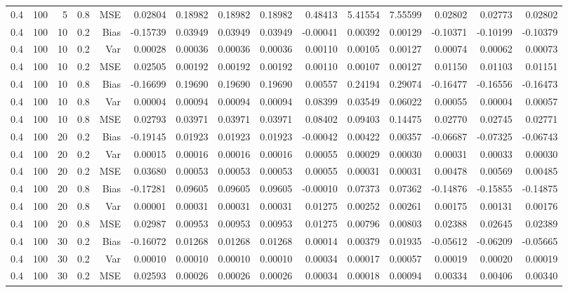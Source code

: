 \begin{table}[!htbp]
\begin{tabular}{lrrrrrrrrrrrrrr}
0.4 & 100 &  5 & 0.8 & MSE & 0.02804 & 0.18982 & 0.18982 & 0.18982 & 0.48413 & 5.41554 & 7.55599 & 0.02802 & 0.02773 & 0.02802 \\
0.4 & 100 & 10 & 0.2 & Bias & -0.15739 & 0.03949 & 0.03949 & 0.03949 & -0.00041 & 0.00392 & 0.00129 & -0.10371 & -0.10199 & -0.10379 \\
0.4 & 100 & 10 & 0.2 & Var & 0.00028 & 0.00036 & 0.00036 & 0.00036 & 0.00110 & 0.00105 & 0.00127 & 0.00074 & 0.00062 & 0.00073 \\
0.4 & 100 & 10 & 0.2 & MSE & 0.02505 & 0.00192 & 0.00192 & 0.00192 & 0.00110 & 0.00107 & 0.00127 & 0.01150 & 0.01103 & 0.01151 \\
0.4 & 100 & 10 & 0.8 & Bias & -0.16699 & 0.19690 & 0.19690 & 0.19690 & 0.00557 & 0.24194 & 0.29074 & -0.16477 & -0.16556 & -0.16473 \\
0.4 & 100 & 10 & 0.8 & Var & 0.00004 & 0.00094 & 0.00094 & 0.00094 & 0.08399 & 0.03549 & 0.06022 & 0.00055 & 0.00004 & 0.00057 \\
0.4 & 100 & 10 & 0.8 & MSE & 0.02793 & 0.03971 & 0.03971 & 0.03971 & 0.08402 & 0.09403 & 0.14475 & 0.02770 & 0.02745 & 0.02771 \\
0.4 & 100 & 20 & 0.2 & Bias & -0.19145 & 0.01923 & 0.01923 & 0.01923 & -0.00042 & 0.00422 & 0.00357 & -0.06687 & -0.07325 & -0.06743 \\
0.4 & 100 & 20 & 0.2 & Var & 0.00015 & 0.00016 & 0.00016 & 0.00016 & 0.00055 & 0.00029 & 0.00030 & 0.00031 & 0.00033 & 0.00030 \\
0.4 & 100 & 20 & 0.2 & MSE & 0.03680 & 0.00053 & 0.00053 & 0.00053 & 0.00055 & 0.00031 & 0.00031 & 0.00478 & 0.00569 & 0.00485 \\
0.4 & 100 & 20 & 0.8 & Bias & -0.17281 & 0.09605 & 0.09605 & 0.09605 & -0.00010 & 0.07373 & 0.07362 & -0.14876 & -0.15855 & -0.14875 \\
0.4 & 100 & 20 & 0.8 & Var & 0.00001 & 0.00031 & 0.00031 & 0.00031 & 0.01275 & 0.00252 & 0.00261 & 0.00175 & 0.00131 & 0.00176 \\
0.4 & 100 & 20 & 0.8 & MSE & 0.02987 & 0.00953 & 0.00953 & 0.00953 & 0.01275 & 0.00796 & 0.00803 & 0.02388 & 0.02645 & 0.02389 \\
0.4 & 100 & 30 & 0.2 & Bias & -0.16072 & 0.01268 & 0.01268 & 0.01268 & 0.00014 & 0.00379 & 0.01935 & -0.05612 & -0.06209 & -0.05665 \\
0.4 & 100 & 30 & 0.2 & Var & 0.00010 & 0.00010 & 0.00010 & 0.00010 & 0.00034 & 0.00017 & 0.00057 & 0.00019 & 0.00020 & 0.00019 \\
0.4 & 100 & 30 & 0.2 & MSE & 0.02593 & 0.00026 & 0.00026 & 0.00026 & 0.00034 & 0.00018 & 0.00094 & 0.00334 & 0.00406 & 0.00340 \\

\end{tabular}
\end{table}
